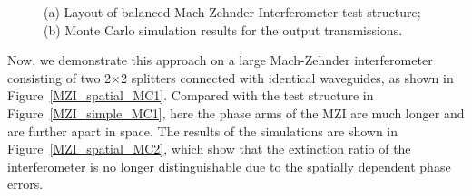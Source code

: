 \documentclass[journal]{spie}
\begin{document}
\begin{figure}[t]
    \centering
{} 
    \caption{(a) Layout of balanced Mach-Zehnder Interferometer test structure; (b) Monte Carlo simulation results for the output transmissions.} 
    \label{spatial}
\end{figure}


Now, we demonstrate this approach on a large Mach-Zehnder interferometer consisting of two 2$\times$2 splitters connected with identical waveguides, as shown in Figure~\ref{MZI_spatial_MC1}. Compared with the test structure in Figure~\ref{MZI_simple_MC1}, here the phase arms of the MZI are much longer and are further apart in space.  The results of the simulations are shown in Figure~\ref{MZI_spatial_MC2}, which show that the extinction ratio of the interferometer is no longer distinguishable due to the spatially dependent phase errors.
\end{document}
